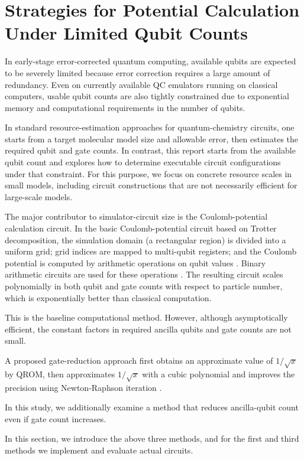 \documentclass[a4paper,11pt]{article}
\begin{document}
\section{Strategies for Potential Calculation Under Limited Qubit Counts}
In early-stage error-corrected quantum computing, available qubits are expected
to be severely limited because error correction requires a large amount of
redundancy. Even on currently available QC emulators running on classical
computers, usable qubit counts are also tightly constrained due to exponential
memory and computational requirements in the number of qubits.

In standard resource-estimation approaches for quantum-chemistry circuits, one
starts from a target molecular model size and allowable error, then estimates
the required qubit and gate counts. In contrast, this report starts from the
available qubit count and explores how to determine executable circuit
configurations under that constraint. For this purpose, we focus on concrete
resource scales in small models, including circuit constructions that are not
necessarily efficient for large-scale models.

The major contributor to simulator-circuit size is the Coulomb-potential
calculation circuit. In the basic Coulomb-potential circuit based on Trotter
decomposition, the simulation domain (a rectangular region) is divided into a
uniform grid; grid indices are mapped to multi-qubit registers; and the Coulomb
potential is computed by arithmetic operations on qubit values
\cite{Zalka-rspa.1998.0162}. Binary arithmetic circuits are used for these
operations \cite{Vedral1996.PhysRevA.54.147}. The resulting circuit scales
polynomially in both qubit and gate counts with respect to particle number,
which is exponentially better than classical computation.

This is the baseline computational method. However, although asymptotically
efficient, the constant factors in required ancilla qubits and gate counts are
not small.

A proposed gate-reduction approach first obtains an approximate value of
$1/\sqrt{x}$ by QROM, then approximates $1/\sqrt{x}$ with a cubic polynomial
and improves the precision using Newton-Raphson iteration
\cite{Rubin2024.pnas.2317772121}.

In this study, we additionally examine a method that reduces ancilla-qubit
count even if gate count increases.

In this section, we introduce the above three methods, and for the first and
third methods we implement and evaluate actual circuits.
\end{document}
